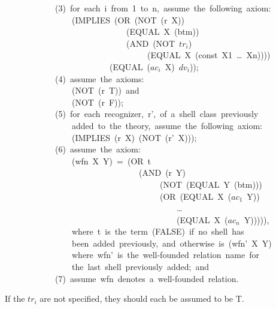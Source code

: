 \documentclass[10pt]{book}
\newenvironment{pubasis}{\begin{flushleft}}{\end{flushleft}}
\begin{document}
\begin{pubasis}
~~~~~~~~~~~~(3)~for~each~i~from~1~to~n,~assume~the~following~axiom:\\

~~~~~~~~~~~~~~~~(IMPLIES~(OR~(NOT~(r~X))\\
~~~~~~~~~~~~~~~~~~~~~~~~~~~~~(EQUAL~X~(btm))\\
~~~~~~~~~~~~~~~~~~~~~~~~~~~~~(AND~(NOT~$tr_{i}$)\\
~~~~~~~~~~~~~~~~~~~~~~~~~~~~~~~~~~(EQUAL~X~(const~X1~\ldots{}~Xn))))\\
~~~~~~~~~~~~~~~~~~~~~~~~~(EQUAL~($ac_{i}$~X)~$dv_{i}$));\\

~~~~~~~~~~~~(4)~assume~the~axioms:\\

~~~~~~~~~~~~~~~~(NOT~(r~T))~and\\

~~~~~~~~~~~~~~~~(NOT~(r~F));\\

~~~~~~~~~~~~(5)~for~each~recognizer,~r',~of~a~shell~class~previously\\
~~~~~~~~~~~~~~~~added~to~the~theory,~assume~the~following~axiom:\\

~~~~~~~~~~~~~~~~(IMPLIES~(r~X)~(NOT~(r'~X)));\\

~~~~~~~~~~~~(6)~assume~the~axiom:\\
~~~~~~~~~~~~~~~~(wfn~X~Y)~=~(OR~t\\
~~~~~~~~~~~~~~~~~~~~~~~~~~~~~~~~(AND~(r~Y)\\
~~~~~~~~~~~~~~~~~~~~~~~~~~~~~~~~~~~~~(NOT~(EQUAL~Y~(btm)))\\
~~~~~~~~~~~~~~~~~~~~~~~~~~~~~~~~~~~~~(OR~(EQUAL~X~($ac_{1}$~Y))\\
~~~~~~~~~~~~~~~~~~~~~~~~~~~~~~~~~~~~~~~~~\ldots{}\\
~~~~~~~~~~~~~~~~~~~~~~~~~~~~~~~~~~~~~~~~~(EQUAL~X~($ac_{n}$~Y))))),\\

~~~~~~~~~~~~~~~~where~t~is~the~term~(FALSE)~if~no~shell~has\\
~~~~~~~~~~~~~~~~been~added~previously,~and~otherwise~is~(wfn'~X~Y)\\
~~~~~~~~~~~~~~~~where~wfn'~is~the~well-founded~relation~name~for\\
~~~~~~~~~~~~~~~~the~last~shell~previously~added;~and\\

~~~~~~~~~~~~(7)~assume~wfn~denotes~a~well-founded~relation.\\
\end{pubasis}
If the $tr_{i}$ are not
specified, they should each be assumed to be T.
\end{document}
